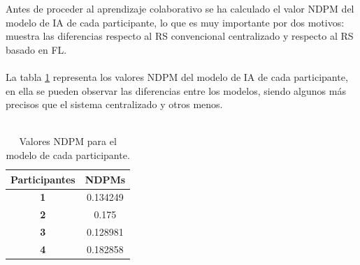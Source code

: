 Antes de proceder al aprendizaje colaborativo se ha calculado el valor NDPM del modelo de IA de cada participante, lo que es muy importante por dos motivos: muestra las diferencias respecto al RS convencional centralizado y respecto al RS basado en FL. 
\\ \\
La tabla \ref{tab:NDPM_PARTICIPANTES} representa los valores NDPM del modelo de IA de cada participante, en ella se pueden observar las diferencias entre los modelos, siendo algunos más precisos que el sistema centralizado y otros menos.
\\\\
\begin{table}[H]
    \begin{center}
        \begin{tabular}{|c|c|}
            \hline
            \rowcolor{Cyan} 
            \textbf{Participantes} & \textbf{NDPMs} \\ 
            \hline
            \textbf{1} & 0.134249 \\
            \hline
            \rowcolor{GrisTabla}
            \textbf{2} & 0.175 \\
            \hline
            \textbf{3} & 0.128981 \\
            \hline
            \rowcolor{GrisTabla}
            \textbf{4} & 0.182858 \\
            \hline
        \end{tabular}
        \caption{\centering Valores NDPM para el modelo de cada participante.}\label{tab:NDPM_PARTICIPANTES}
    \end{center}    
\end{table}

